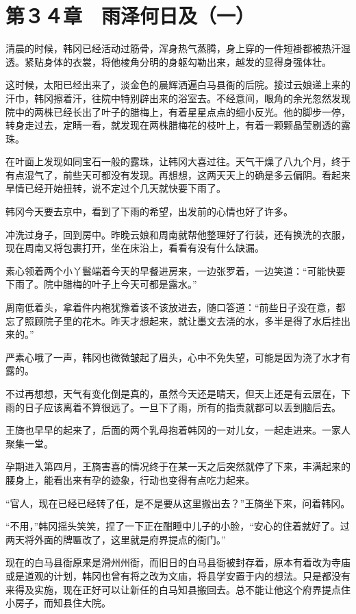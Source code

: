 \section{第３４章　雨泽何日及（一）}

清晨的时候，韩冈已经活动过筋骨，浑身热气蒸腾，身上穿的一件短褂都被热汗湿透。紧贴身体的衣裳，将他棱角分明的身躯勾勒出来，越发的显得身强体壮。

这时候，太阳已经出来了，淡金色的晨辉洒遍白马县衙的后院。接过云娘递上来的汗巾，韩冈擦着汗，往院中特别辟出来的浴室去。不经意间，眼角的余光忽然发现院中的两株已经长出了叶子的腊梅上，有着星星点点的细小反光。他的脚步一停，转身走过去，定睛一看，就发现在两株腊梅花的枝叶上，有着一颗颗晶莹剔透的露珠。

在叶面上发现如同宝石一般的露珠，让韩冈大喜过往。天气干燥了八九个月，终于有点湿气了，前些天可都没有发现。再想想，这两天天上的确是多云偏阴。看起来旱情已经开始扭转，说不定过个几天就快要下雨了。

韩冈今天要去京中，看到了下雨的希望，出发前的心情也好了许多。

冲洗过身子，回到房中。昨晚云娘和周南就帮他整理好了行装，还有换洗的衣服，现在周南又将包裹打开，坐在床沿上，看看有没有什么缺漏。

素心领着两个小丫鬟端着今天的早餐进房来，一边张罗着，一边笑道：“可能快要下雨了。院中腊梅的叶子上今天可都是露水。”

周南低着头，拿着件内袍犹豫着该不该放进去，随口答道：“前些日子没在意，都忘了照顾院子里的花木。昨天才想起来，就让墨文去浇的水，多半是得了水后挂出来的。”

严素心哦了一声，韩冈也微微皱起了眉头，心中不免失望，可能是因为浇了水才有露的。

不过再想想，天气有变化倒是真的，虽然今天还是晴天，但天上还是有云层在，下雨的日子应该离着不算很远了。一旦下了雨，所有的指责就都可以丢到脑后去。

王旖也早早的起来了，后面的两个乳母抱着韩冈的一对儿女，一起走进来。一家人聚集一堂。

孕期进入第四月，王旖害喜的情况终于在某一天之后突然就停了下来，丰满起来的腰身上，能看出来有孕的迹象，行动也变得有点吃力起来。

“官人，现在已经已经转了任，是不是要从这里搬出去？”王旖坐下来，问着韩冈。

“不用，”韩冈摇头笑笑，捏了一下正在酣睡中儿子的小脸，“安心的住着就好了。过两天将外面的牌匾改了，这里就是府界提点的衙门。”

现在的白马县衙原来是滑州州衙，而旧日的白马县衙被封存着，原本有着改为寺庙或是道观的计划，韩冈也曾有将之改为文庙，将县学安置于内的想法。只是都没有来得及实施，现在正好可以让新任的白马知县搬回去。总不能让他这个府界提点住小房子，而知县住大院。

